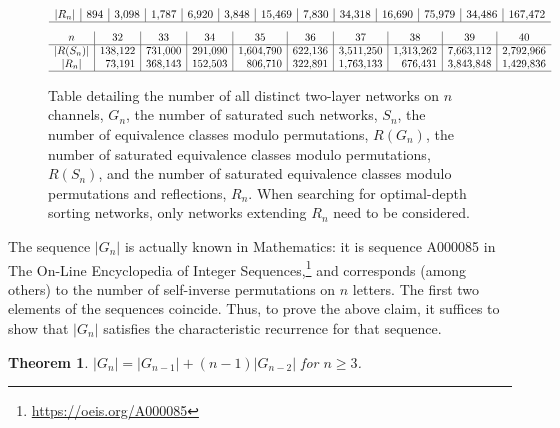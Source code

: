 \documentclass[10pt]{IEEEtran}
\newtheorem{theorem}{Theorem}
\begin{document}
\begin{figure*}[t]
\[\begin{array}{c|r|r|r|r|r|r|r|r|r|r|r|r}
|R_n| & 894 & 3{,}098 & 1{,}787 & 6{,}920 & 3{,}848 & 15{,}469 & 7{,}830 & 34{,}318 & 16{,}690 & 75{,}979 & 34{,}486 & 167{,}472 \\ \hline
\end{array}\]
\[\begin{array}{c|r|r|r|r|r|r|r|r|r}
n
 & \multicolumn1{c|}{32}
 & \multicolumn1{c|}{33}
 & \multicolumn1{c|}{34}
 & \multicolumn1{c|}{35}
 & \multicolumn1{c|}{36}
 & \multicolumn1{c|}{37}
 & \multicolumn1{c|}{38}
 & \multicolumn1{c|}{39}
 & \multicolumn1{c}{40} \\ \hline
|R(S_n)| & 138{,}122 & 731{,}000 & 291{,}090 & 1{,}604{,}790 & 622{,}136 & 3{,}511{,}250 & 1{,}313{,}262 & 7{,}663{,}112 & 2{,}792{,}966 \\
|R_n| & 73{,}191 & 368{,}143 & 152{,}503 & 806{,}710 & 322{,}891 & 1{,}763{,}133 & 676{,}431 & 3{,}843{,}848 & 1{,}429{,}836 \\ \hline
\end{array}\]
\caption{Table detailing the number of all distinct two-layer networks
on $n$ channels, $G_n$, the number of saturated such networks, $S_n$, the number of equivalence classes modulo permutations, $R(G_n)$, the number of saturated equivalence classes modulo permutations, $R(S_n)$, and the number of saturated equivalence classes modulo permutations and reflections, $R_n$. When searching for optimal-depth sorting networks, only networks extending $R_n$ need to be considered.}
\label{fig:table}
\end{figure*}

The sequence $|G_n|$ is actually known in Mathematics: it is sequence
A000085 in The On-Line Encyclopedia of Integer
Sequences,\footnote{\url{https://oeis.org/A000085}} and corresponds
(among others) to the number of self-inverse permutations on $n$
letters. The first two elements of the sequences coincide. Thus, to prove the above claim, it suffices to show that $|G_n|$ satisfies
the characteristic recurrence for that sequence.

\begin{theorem}\label{thm:recurrence}
  $\left|G_n\right|=\left|G_{n-1}\right|+(n-1)\left|G_{n-2}\right|$ for $n\geq3$.
\end{theorem}
\end{document}
